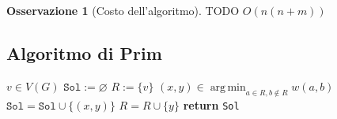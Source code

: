 \documentclass[14pt]{extreport}
\DeclareMathOperator*{\argmin}{arg\,min}
\theoremstyle{definition}
\theoremstyle{definition}
\newtheorem{remark}{Osservazione}[subsection]
\begin{document}
\begin{remark}[Costo dell'algoritmo]
    TODO $O(n(n + m))$
\end{remark}

\subsection{Algoritmo di Prim}

\begin{algorithm}[H]
    \caption{
        Dato un grafo indiretto connesso $G$, pesato attraverso $w$ con pesi positivi, l'algoritmo ne restituisce un MST.\\
        \textbf{Input}: $G$ grafo indiretto connesso; $w$ una funzione che associa pesi positivi agli archi in $E(G)$.\\
        \textbf{Output}: un MST di $G$.
    }

    \begin{algorithmic}[1]
            \State $v \in V(G)$
            \State $\texttt{Sol} := \varnothing$
            \State $R := \{v\}$
                \State $\displaystyle (x, y) \in \argmin_{a \in R, b \notin R} {w(a, b)}$
                \State $\texttt{Sol} = \texttt{Sol} \cup \{ (x, y) \}$
                \State $R = R \cup \{y\}$
            \EndWhile
            \State \textbf{return} \texttt{Sol}
        \EndFunction
    \end{algorithmic}
\end{algorithm}
\end{document}

